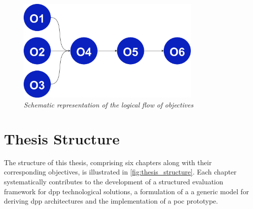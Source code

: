 \begin{figure}[htbp]
  \centering
  \includegraphics[width=0.8\textwidth]{figures/objectives_diagram.pdf}
  \caption{%
    \textit{Schematic representation of the logical flow of objectives} 
  }
  \label{fig:objectives_flow}
\end{figure}

\section{Thesis Structure}
\label{sec:thesis_structure}

The structure of this thesis, comprising six chapters along with their corresponding objectives, is illustrated in \cref{fig:thesis_structure}. Each chapter systematically contributes to the development of a structured evaluation framework for \acrlong{dpp} technological solutions, a formulation of a a generic model for deriving \ac{dpp} architectures and the implementation of a \acrlong{poc} prototype.

